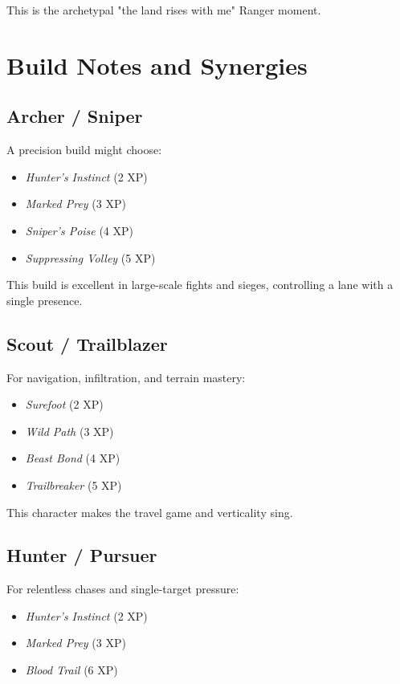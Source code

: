 \documentclass[11pt]{book}
\begin{document}
This is the archetypal "the land rises with me" Ranger moment.

\section{Build Notes and Synergies}

\subsection{Archer / Sniper}

A precision build might choose:
\begin{itemize}
  \item \emph{Hunter's Instinct} (2 XP)
  \item \emph{Marked Prey} (3 XP)
  \item \emph{Sniper's Poise} (4 XP)
  \item \emph{Suppressing Volley} (5 XP)
\end{itemize}

This build is excellent in large-scale fights and sieges,
controlling a lane with a single presence.

\subsection{Scout / Trailblazer}

For navigation, infiltration, and terrain mastery:
\begin{itemize}
  \item \emph{Surefoot} (2 XP)
  \item \emph{Wild Path} (3 XP)
  \item \emph{Beast Bond} (4 XP)
  \item \emph{Trailbreaker} (5 XP)
\end{itemize}

This character makes the travel game and verticality sing.

\subsection{Hunter / Pursuer}

For relentless chases and single-target pressure:
\begin{itemize}
  \item \emph{Hunter's Instinct} (2 XP)
  \item \emph{Marked Prey} (3 XP)
  \item \emph{Blood Trail} (6 XP)
\end{itemize}
\end{document}
